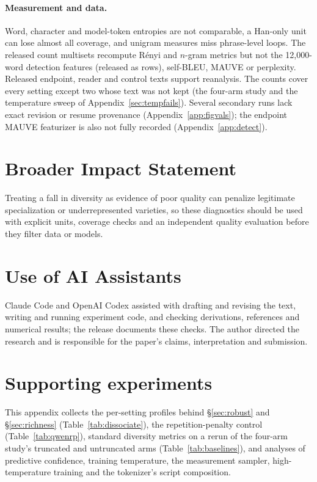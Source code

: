 \documentclass[10pt]{article}
\theoremstyle{plain}
\theoremstyle{definition}
\begin{document}
\paragraph{Measurement and data.} Word, character and model-token entropies are not comparable,
a Han-only unit can lose almost all coverage, and unigram measures miss phrase-level loops. The
released count multisets recompute R\'enyi and $n$-gram metrics but not the 12,000-word detection
features (released as rows), self-BLEU, MAUVE or perplexity. Released endpoint, reader and control texts support reanalysis. The counts cover every
setting except two whose text was not kept (the four-arm study and the temperature sweep of
Appendix~\ref{sec:tempfails}). Several secondary runs lack exact revision or resume provenance (Appendix~\ref{app:figvals});
the endpoint MAUVE featurizer is also not fully recorded (Appendix~\ref{app:detect}).

\section*{Broader Impact Statement}
Treating a fall in diversity as evidence of poor quality can penalize legitimate specialization
or underrepresented varieties, so these diagnostics should be used with explicit units, coverage
checks and an independent quality evaluation before they filter data or models.

\section*{Use of AI Assistants}
Claude Code and OpenAI Codex assisted with drafting and revising the text, writing and running
experiment code, and checking derivations, references and numerical results; the release
documents these checks. The author directed the research and is responsible for the paper's
claims, interpretation and submission.




\clearpage
\appendix

\section{Supporting experiments}
\label{app:support}

This appendix collects the per-setting profiles behind \S\ref{sec:robust} and
\S\ref{sec:richness} (Table~\ref{tab:dissociate}), the repetition-penalty control
(Table~\ref{tab:qwenrp}), standard diversity metrics on a rerun of the four-arm study's truncated
and untruncated arms (Table~\ref{tab:baselines}), and analyses of predictive confidence, training
temperature, the measurement sampler, high-temperature training and the tokenizer's script
composition.
\end{document}

